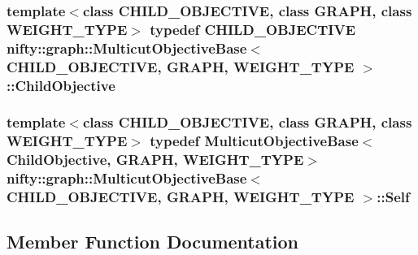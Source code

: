 \subsubsection[{Child\+Objective}]{\setlength{\rightskip}{0pt plus 5cm}template$<$class C\+H\+I\+L\+D\+\_\+\+O\+B\+J\+E\+C\+T\+I\+V\+E, class G\+R\+A\+P\+H, class W\+E\+I\+G\+H\+T\+\_\+\+T\+Y\+P\+E$>$ typedef C\+H\+I\+L\+D\+\_\+\+O\+B\+J\+E\+C\+T\+I\+V\+E {\bf nifty\+::graph\+::\+Multicut\+Objective\+Base}$<$ C\+H\+I\+L\+D\+\_\+\+O\+B\+J\+E\+C\+T\+I\+V\+E, G\+R\+A\+P\+H, W\+E\+I\+G\+H\+T\+\_\+\+T\+Y\+P\+E $>$\+::{\bf Child\+Objective}}\label{classnifty_1_1graph_1_1MulticutObjectiveBase_a7150df879f2ca2a3966d198a02c5aa87}
\hypertarget{classnifty_1_1graph_1_1MulticutObjectiveBase_a812074f34dac1eb52fd5865b51dbdb28}{}
\subsubsection[{Self}]{\setlength{\rightskip}{0pt plus 5cm}template$<$class C\+H\+I\+L\+D\+\_\+\+O\+B\+J\+E\+C\+T\+I\+V\+E, class G\+R\+A\+P\+H, class W\+E\+I\+G\+H\+T\+\_\+\+T\+Y\+P\+E$>$ typedef {\bf Multicut\+Objective\+Base}$<${\bf Child\+Objective}, G\+R\+A\+P\+H, W\+E\+I\+G\+H\+T\+\_\+\+T\+Y\+P\+E$>$ {\bf nifty\+::graph\+::\+Multicut\+Objective\+Base}$<$ C\+H\+I\+L\+D\+\_\+\+O\+B\+J\+E\+C\+T\+I\+V\+E, G\+R\+A\+P\+H, W\+E\+I\+G\+H\+T\+\_\+\+T\+Y\+P\+E $>$\+::{\bf Self}}\label{classnifty_1_1graph_1_1MulticutObjectiveBase_a812074f34dac1eb52fd5865b51dbdb28}


\subsection{Member Function Documentation}
\hypertarget{classnifty_1_1graph_1_1MulticutObjectiveBase_a9cf3579580eb35e1b4156aa35018536f}{}
